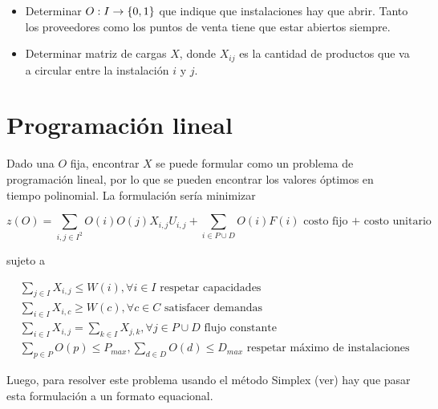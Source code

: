 \begin{itemize}
\item Determinar $O: I \to \{ 0, 1 \}$ que indique que instalaciones
  hay que abrir. Tanto los proveedores como los puntos de venta tiene
  que estar abiertos siempre.
\item Determinar matriz de cargas $X$, donde $X_{ij}$ es la cantidad
  de productos que va a circular entre la instalación $i$ y $j$.
\end{itemize}

\section{Programación lineal}

Dado una $O$ fija, encontrar $X$ se puede formular como un problema de
programación lineal, por lo que se pueden encontrar los valores
óptimos en tiempo polinomial. La formulación sería minimizar

\begin{equation}
  \label{eq:supply-cost}
  z(O) = \sum_{i, j \in I^{2}}{O(i)O(j)X_{i, j}U_{i, j}} +
  \sum_{i \in P \cup D}{O(i)F(i)}
  \text{ costo fijo + costo unitario }
\end{equation}

sujeto a

\begin{align*}
  \label{eq:supply-constraints}
  &\sum_{j \in I}{X_{i, j}} \leq W(i), \forall i \in I
    \text{ respetar capacidades }\\
  &\sum_{i \in I}{X_{i, c}} \geq W(c), \forall c \in C
    \text{ satisfacer demandas }\\
  &\sum_{i \in I}{X_{i, j}} = \sum_{k \in I}{X_{j, k}}, \forall j \in P \cup D
    \text{ flujo constante }\\
  &\sum_{p \in P}{O(p)} \leq P_{max}, \sum_{d \in D}{O(d)} \leq D_{max}
    \text{ respetar máximo de instalaciones}
\end{align*}

Luego, para resolver este problema usando el método Simplex (ver\label{app:linprog})
hay que pasar esta formulación a un formato equacional.
